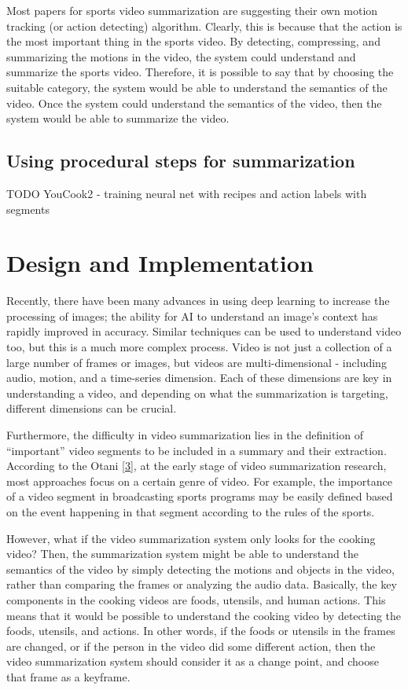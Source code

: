 \documentclass{article}
\begin{document}
Most papers for sports video summarization are suggesting their own motion tracking (or action detecting) algorithm. Clearly, this is because that the action is the most important thing in the sports video. By detecting, compressing, and summarizing the motions in the video, the system could understand and summarize the sports video. Therefore, it is possible to say that by choosing the suitable category, the system would be able to understand the semantics of the video. Once the system could understand the semantics of the video, then the system would be able to summarize the video.

\subsection{Using procedural steps for summarization}

TODO YouCook2 - training neural net with recipes and action labels with segments

\section{Design and Implementation}

Recently, there have been many advances in using deep learning to increase the processing of images; the ability for AI to understand an image’s context has rapidly improved in accuracy. Similar techniques can be used to understand video too, but this is a much more complex process. Video is not just a collection of a large number of frames or images, but videos are multi-dimensional - including audio, motion, and a time-series dimension. Each of these dimensions are key in understanding a video, and depending on what the summarization is targeting, different dimensions can be crucial.

Furthermore, the difficulty in video summarization lies in the definition of “important” video segments to be included in a summary and their extraction. According to the Otani \hyperlink{ref3}{[3]}, at the early stage of video summarization research, most approaches focus on a certain genre of video. For example, the importance of a video segment in broadcasting sports programs may be easily defined based on the event happening in that segment according to the rules of the sports.

However, what if the video summarization system only looks for the cooking video? Then, the summarization system might be able to understand the semantics of the video by simply detecting the motions and objects in the video, rather than comparing the frames or analyzing the audio data. Basically, the key components in the cooking videos are foods, utensils, and human actions. This means that it would be possible to understand the cooking video by detecting the foods, utensils, and actions. In other words, if the foods or utensils in the frames are changed, or if the person in the video did some different action, then the video summarization system should consider it as a change point, and choose that frame as a keyframe.
\end{document}
